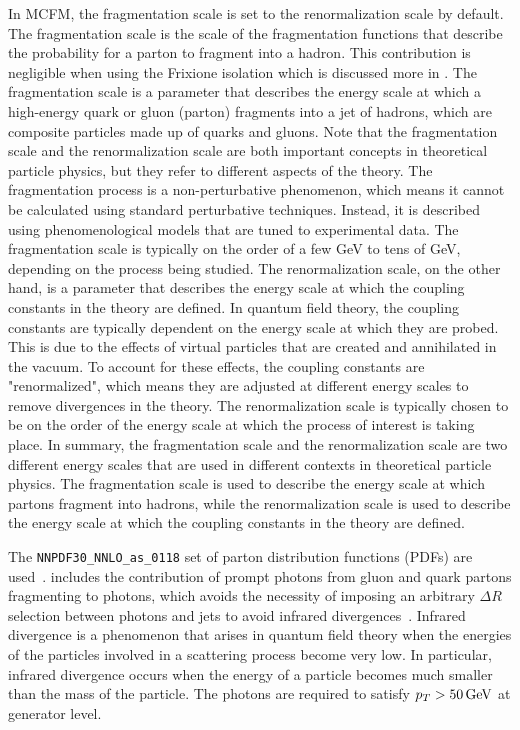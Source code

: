 In MCFM, the fragmentation scale is set to the renormalization scale by default. The fragmentation scale is the scale of the fragmentation functions that describe the probability for a parton to fragment into a hadron. This contribution is negligible when using the Frixione isolation which is discussed more in \cite{Frixione:1998jh}. The fragmentation scale is a parameter that describes the energy scale at which a high-energy quark or gluon (parton) fragments into a jet of hadrons, which are composite particles made up of quarks and gluons. Note that the fragmentation scale and the renormalization scale are both important concepts in theoretical particle physics, but they refer to different aspects of the theory. The fragmentation process is a non-perturbative phenomenon, which means it cannot be calculated using standard perturbative techniques. Instead, it is described using phenomenological models that are tuned to experimental data. The fragmentation scale is typically on the order of a few GeV to tens of GeV, depending on the process being studied. The renormalization scale, on the other hand, is a parameter that describes the energy scale at which the coupling constants in the theory are defined. In quantum field theory, the coupling constants are typically dependent on the energy scale at which they are probed. This is due to the effects of virtual particles that are created and annihilated in the vacuum. To account for these effects, the coupling constants are "renormalized", which means they are adjusted at different energy scales to remove divergences in the theory. The renormalization scale is typically chosen to be on the order of the energy scale at which the process of interest is taking place. In summary, the fragmentation scale and the renormalization scale are two different energy scales that are used in different contexts in theoretical particle physics. The fragmentation scale is used to describe the energy scale at which partons fragment into hadrons, while the renormalization scale is used to describe the energy scale at which the coupling constants in the theory are defined.

The \texttt{NNPDF30\_NNLO\_as\_0118} set of parton distribution functions (PDFs) are used~\cite{Ball:2014uwa}. \SHERPA includes the contribution of prompt photons from gluon and quark partons fragmenting to photons, which avoids the necessity of imposing an arbitrary $\Delta R$ selection between photons and jets to avoid infrared divergences~\cite{Hoeche:2009xc}. Infrared divergence is a phenomenon that arises in quantum field theory when the energies of the particles involved in a scattering process become very low. In particular, infrared divergence occurs when the energy of a particle becomes much smaller than the mass of the particle. 
The photons are required to satisfy $p_{T} > 50 \,\text{Ge\hspace{-.08em}V}$ at generator level.

